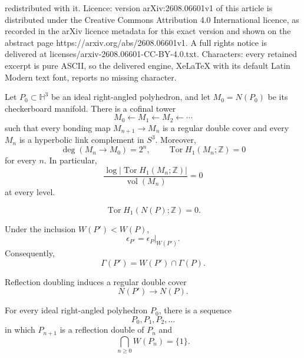 \documentclass[10pt,a4paper]{amsart}
\newcommand{\HH}{\mathbb H}
\newcommand{\Tor}{\operatorname{Tor}}
\newcommand{\ZZ}{\mathbb Z}
\newcommand{\vol}{\operatorname{vol}}
\begin{document}
redistributed with it. Licence: version arXiv:2608.06601v1 of this article is distributed under the Creative Commons Attribution 4.0 International licence, as recorded in the arXiv licence metadata for this exact version and shown on the abstract page https://arxiv.org/abs/2608.06601v1. A full rights notice is delivered at licenses/arxiv-2608.06601-CC-BY-4.0.txt. Characters: every retained excerpt is pure ASCII, so the delivered engine, XeLaTeX with its default Latin Modern text font, reports no missing character.
\begin{theorem}\label{thm:main}
Let $P_0\subset\HH^3$ be an ideal right-angled polyhedron, and let $M_0=N(P_0)$ be its checkerboard manifold.  There is a cofinal tower
\begin{equation}\label{eq:main-tower}
  M_0 \longleftarrow M_1 \longleftarrow M_2 \longleftarrow \cdots
\end{equation}
such that every bonding map $M_{n+1}\to M_n$ is a regular double cover and every $M_n$ is a hyperbolic link complement in $S^3$.  Moreover,
\[
  \deg(M_n\to M_0)=2^n,
  \qquad
  \Tor H_1(M_n;\ZZ)=0
\]
for every $n$.  In particular,
\[
  \frac{\log |\Tor H_1(M_n;\ZZ)|}{\vol(M_n)}=0
\]
at every level.
\end{theorem}

\begin{equation}\label{eq:H1-torsion-free}
  \Tor H_1(N(P);\ZZ)=0.
\end{equation}

\begin{proposition}\label{prop:compatibility}
Under the inclusion $W(P')<W(P)$,
\begin{equation}\label{eq:compatibility}
  \epsilon_{P'}=\left.\epsilon_P\right|_{W(P')}.
\end{equation}
Consequently,
\begin{equation}\label{eq:kernel-pullback}
  \Gamma(P')=W(P')\cap\Gamma(P).
\end{equation}
\end{proposition}

\begin{corollary}\label{cor:double-cover}
Reflection doubling induces a regular double cover
\begin{equation}\label{eq:double-cover}
  N(P')\longrightarrow N(P).
\end{equation}
\end{corollary}

\begin{theorem}[Gir\~ao]\label{thm:Girao}
For every ideal right-angled polyhedron $P_0$, there is a sequence
\begin{equation}\label{eq:polyhedron-sequence}
  P_0,P_1,P_2,\ldots
\end{equation}
in which $P_{n+1}$ is a reflection double of $P_n$ and
\begin{equation}\label{eq:W-cofinal}
  \bigcap_{n\geq0}W(P_n)=\{1\}.
\end{equation}
\end{theorem}
\end{document}

